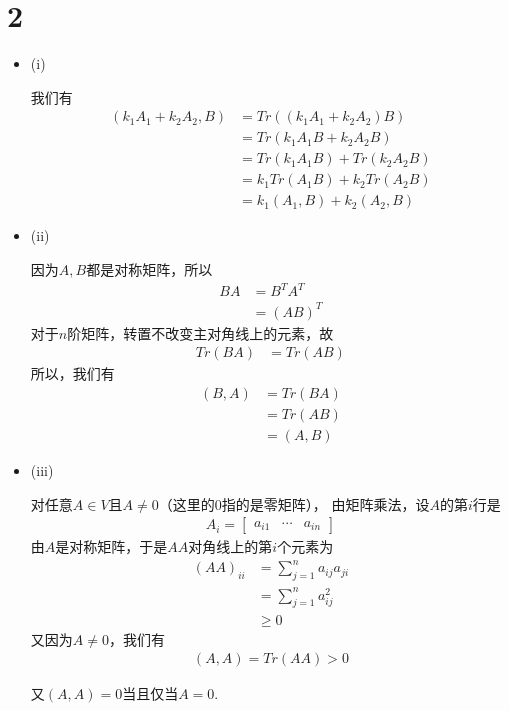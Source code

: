 \documentclass{article}
\begin{document}
\section*{2}

\begin{itemize}
  \item (i)

        我们有
        \begin{align*}
          (k_1 A_1 + k_2 A_2, B)
           & = Tr((k_1 A_1 + k_2 A_2) B)     \\
           & = Tr(k_1 A_1 B + k_2 A_2 B)     \\
           & = Tr(k_1 A_1 B) + Tr(k_2 A_2 B) \\
           & = k_1 Tr(A_1 B) + k_2 Tr(A_2 B) \\
           & = k_1 (A_1, B) + k_2 (A_2, B)
        \end{align*}

  \item (ii)

        因为$A, B$都是对称矩阵，所以
        \begin{align*}
          BA & = B^T A^T \\
             & = (AB)^T
        \end{align*}
        对于$n$阶矩阵，转置不改变主对角线上的元素，故
        \begin{align*}
          Tr(BA) & = Tr(AB)
        \end{align*}
        所以，我们有
        \begin{align*}
          (B, A) & = Tr(BA) \\
                 & = Tr(AB) \\
                 & = (A, B)
        \end{align*}

  \item (iii)

        对任意$A \in V$且$A \neq 0$（这里的$0$指的是零矩阵），
        由矩阵乘法，设$A$的第$i$行是
        \begin{align*}
          A_i = \begin{bmatrix}
                  a_{i1} & \cdots & a_{in}
                \end{bmatrix}
        \end{align*}
        由$A$是对称矩阵，于是$AA$对角线上的第$i$个元素为
        \begin{align*}
          (AA)_{ii} & = \sum_{j=1}^n a_{ij}a_{ji} \\
                    & = \sum_{j=1}^n a_{ij}^2     \\
                    & \geq 0
        \end{align*}
        又因为$A \neq 0$，我们有
        \begin{align*}
          (A, A) = Tr(AA) > 0
        \end{align*}

        又$(A, A) = 0$当且仅当$A = 0$.
\end{itemize}
\end{document}
